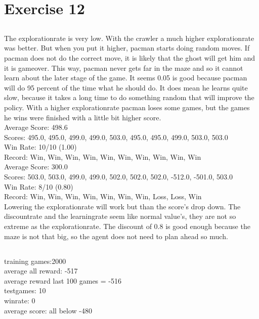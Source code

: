 \newpage{}
\section{Exercise 12}
\subsection{}
The explorationrate is very low. With the crawler a much higher 
explorationrate was better. But when you put it higher, pacman starts 
doing random moves. If pacman does not do the correct move, it is 
likely that the ghost will get him and it is gameover. This way, pacman
never gets far in the maze and so it cannot learn about the later stage
of the game. It seems 0.05 is good because pacman will do 95 percent 
of the time what he should do. It does mean he learns quite slow, because
it takes a long time to do something random that will improve the policy.
With a higher explorationrate pacman loses some games, but the 
games he wins were finished with a little bit higher score.\\
Average Score: 498.6\\
Scores:        495.0, 495.0, 499.0, 499.0, 503.0, 495.0, 495.0, 499.0, 503.0, 503.0\\
Win Rate:      10/10 (1.00)\\
Record:        Win, Win, Win, Win, Win, Win, Win, Win, Win, Win\\
Average Score: 300.0\\
Scores:        503.0, 503.0, 499.0, 499.0, 502.0, 502.0, 502.0, -512.0, -501.0, 503.0\\
Win Rate:      8/10 (0.80)\\
Record:        Win, Win, Win, Win, Win, Win, Win, Loss, Loss, Win\\

Lowering the explorationrate will work but than the score's drop down.
The discountrate and the learningrate seem like normal value's, they 
are not so extreme as the explorationrate. The discount of 0.8 is good 
enough because the maze is not that big, so the agent does not need to 
plan ahead so much.

\subsection{}
training games:2000\\
average all reward: -517\\
average reward last 100 games = -516\\
testgames: 10\\
winrate: 0\\
average score: all below -480\\

